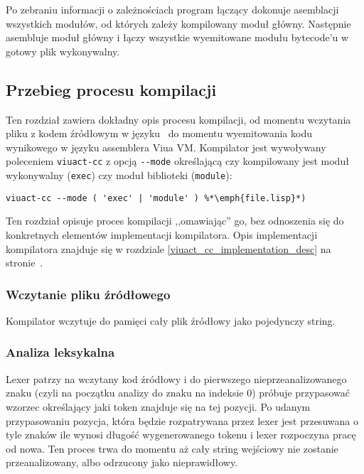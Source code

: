 Po zebraniu informacji o zależnościach program łączący dokonuje asemblacji wszystkich modułów, od których
zależy kompilowany moduł główny. Następnie asembluje moduł główny i łączy wszystkie wyemitowane modułu
bytecode'u w gotowy plik wykonywalny.

\subsection{Przebieg procesu kompilacji}
\label{opis_etapow_kompilacji}

Ten rozdział zawiera dokładny opis procesu kompilacji, od momentu wczytania
pliku z kodem źródłowym w języku \ViuAct\ do momentu wyemitowania kodu
wynikowego w języku assemblera Viua VM. Kompilator jest wywoływany poleceniem
\texttt{viuact-cc} z opcją \texttt{-}\texttt{-mode} określającą czy kompilowany
jest moduł wykonywalny (\texttt{exec}) czy moduł biblioteki (\texttt{module}):

\begin{lstlisting}
viuact-cc --mode ( 'exec' | 'module' ) %*\emph{file.lisp}*)
\end{lstlisting}

Ten rozdział opisuje proces kompilacji ,,omawiając'' go, bez odnoszenia się do
konkretnych elementów implementacji kompilatora. Opis implementacji kompilatora
znajduje się w rozdziale \ref{viuact_cc_implementation_desc} na
stronie~\pageref{viuact_cc_implementation_desc}.

\subsubsection{Wczytanie pliku źródłowego}

Kompilator wczytuje do pamięci cały plik źródłowy jako pojedynczy string.

\subsubsection{Analiza leksykalna}

Lexer patrzy na wczytany kod źródłowy i do pierwszego nieprzeanalizowanego znaku (czyli na początku analizy do
znaku na indeksie 0) próbuje przypasować wzorzec określający jaki token znajduje się na tej pozycji. Po udanym
przypasowaniu pozycja, która będzie rozpatrywana przez lexer jest przesuwana o tyle znaków ile wynosi długość
wygenerowanego tokenu i lexer rozpoczyna pracę od nowa. Ten proces trwa do momentu aż cały string wejściowy
nie zostanie przeanalizowany, albo odrzucony jako nieprawidłowy.


